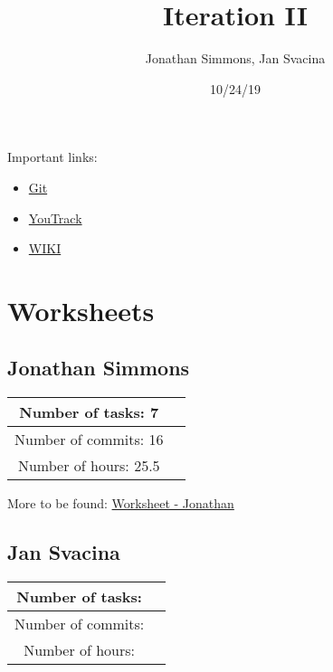 \documentclass{article}
\title{Iteration II}
\date{10/24/19}
\author{Jonathan Simmons, Jan Svacina}
\begin{document}
    \maketitle

    Important links:

    \begin{itemize}
        \item \href{https://github.com/johnsimmons2/heuristic-dl/commits/master}{Git}
        \item \href{https://seer.ecs.baylor.edu/youtrack/agiles/94-11/95-11}{YouTrack}
        \item \href{https://github.com/johnsimmons2/heuristic-dl/wiki}{WIKI}
    \end{itemize}

    \section{Worksheets}

    \subsection*{Jonathan Simmons}

    \begin{center}
        \begin{tabular}{||c c ||}
            \hline
            Number of tasks: 7&  \\
            \hline
            Number of commits: 16&  \\
            \hline
            Number of hours: 25.5&  \\
            \hline
        \end{tabular}
    \end{center}

    More to be found: \href{https://github.com/johnsimmons2/heuristic-dl/wiki/Worksheet:-Jonathan}{Worksheet -
    Jonathan}

    \subsection*{Jan Svacina}

    \begin{center}
        \begin{tabular}{||c c ||}
            \hline
            Number of tasks: &  \\
            \hline
            Number of commits: &  \\
            \hline
            Number of hours: &  \\
            \hline
        \end{tabular}
    \end{center}
\end{document}
